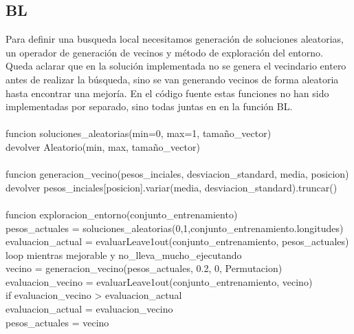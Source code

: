 \documentclass[12pt, spanish]{article}
\newcommand\tab[1][1cm]{\hspace*{#1}}
\begin{document}
\pagebreak
\subsection{BL}
Para definir una busqueda local necesitamos generación de soluciones aleatorias, un operador de generación de vecinos y método de exploración del entorno. Queda aclarar que en la solución implementada no se genera el vecindario entero antes de realizar la búsqueda, sino se van generando vecinos de forma aleatoria hasta encontrar una mejoría. En el código fuente estas funciones no han sido implementadas por separado, sino todas juntas en en la función BL. \\
\\
funcion soluciones\_aleatorias(min=0, max=1, tamaño\_vector) { \\
\tab	devolver Aleatorio(min, max, tamaño\_vector) \\
}\\
funcion generacion\_vecino(pesos\_inciales, desviacion\_standard, media, posicion) {\\
\tab	devolver pesos\_inciales[posicion].variar(media, desviacion\_standard).truncar()\\
}\\
funcion exploracion\_entorno(conjunto\_entrenamiento) {\\
\tab	pesos\_actuales = soluciones\_aleatorias(0,1,conjunto\_entrenamiento.longitudes)\\
\tab	evaluacion\_actual = evaluarLeave1out(conjunto\_entrenamiento, pesos\_actuales)\\
\tab	loop mientras mejorable y no\_lleva\_mucho\_ejecutando{\\
\tab		vecino = generacion\_vecino(pesos\_actuales, 0.2, 0, Permutacion)\\
\tab		evaluacion\_vecino = evaluarLeave1out(conjunto\_entrenamiento, vecino) \\
\tab		if evaluacion\_vecino > evaluacion\_actual {\\
\tab\tab			evaluacion\_actual = evaluacion\_vecino\\
	\tab\tab		pesos\_actuales  = vecino \\
		}\\
	}	 \\
} \\
\end{document}
